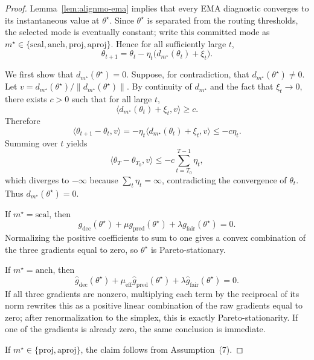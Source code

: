 \begin{proof}
Lemma~\ref{lem:alignmo-ema} implies that every EMA diagnostic converges to its instantaneous
value at $\theta^\star$. Since $\theta^\star$ is separated from the routing thresholds,
the selected mode is eventually constant;
write this committed mode as $m^\star\in\{\mathrm{scal},\mathrm{anch},\mathrm{proj},\mathrm{aproj}\}$.
Hence for all sufficiently large $t$,
\[
\theta_{t+1}
=
\theta_t-\eta_t\bigl(d_{m^\star}(\theta_t)+\xi_t\bigr).
\]

We first show that $d_{m^\star}(\theta^\star)=0$.
Suppose, for contradiction, that $d_{m^\star}(\theta^\star)\neq 0$.
Let
$v=d_{m^\star}(\theta^\star)/\|d_{m^\star}(\theta^\star)\|$.
By continuity of $d_{m^\star}$ and the fact that $\xi_t\to 0$,
there exists $c>0$ such that for all large $t$,
\[
\langle d_{m^\star}(\theta_t)+\xi_t, v\rangle \ge c.
\]
Therefore
\[
\langle \theta_{t+1}-\theta_t, v\rangle
=
-\eta_t\langle d_{m^\star}(\theta_t)+\xi_t, v\rangle
\le -c\eta_t.
\]
Summing over $t$ yields
\[
\langle \theta_T-\theta_{T_0}, v\rangle \le -c\sum_{t=T_0}^{T-1}\eta_t,
\]
which diverges to $-\infty$ because $\sum_t\eta_t=\infty$, contradicting the convergence of $\theta_t$.
Thus $d_{m^\star}(\theta^\star)=0$.

If $m^\star=\mathrm{scal}$, then
\[
g_{\mathrm{dec}}(\theta^\star)+\mu g_{\mathrm{pred}}(\theta^\star)+\lambda g_{\mathrm{fair}}(\theta^\star)=0.
\]
Normalizing the positive coefficients to sum to one gives a convex combination of the three gradients equal to zero, so $\theta^\star$ is Pareto-stationary.

If $m^\star=\mathrm{anch}$, then
\[
\widehat g_{\mathrm{dec}}(\theta^\star)
+\mu_{\mathrm{eff}}\widehat g_{\mathrm{pred}}(\theta^\star)
+\lambda \widehat g_{\mathrm{fair}}(\theta^\star)=0.
\]
If all three gradients are nonzero, multiplying each term by the reciprocal of its norm rewrites this as a positive linear combination of the raw gradients equal to zero; after renormalization to the simplex, this is exactly Pareto-stationarity. If one of the gradients is already zero, the same conclusion is immediate.

If $m^\star\in\{\mathrm{proj},\mathrm{aproj}\}$, the claim follows from Assumption~(7).
\end{proof}

